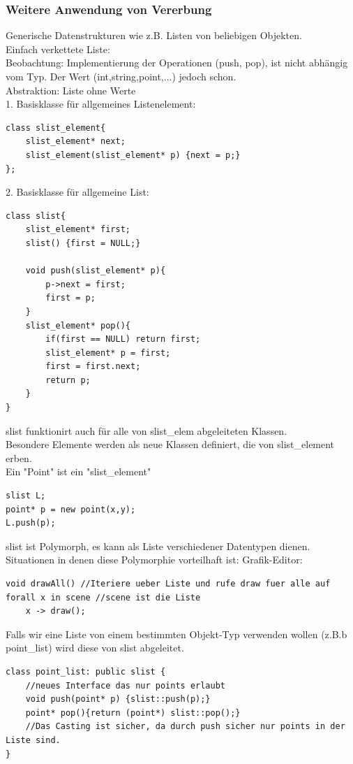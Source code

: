 \documentclass[a4paper]{article}
\begin{document}
\subsubsection*{Weitere Anwendung von Vererbung}
Generische Datenstrukturen wie z.B. Listen von beliebigen Objekten.\\
Einfach verkettete Liste:\\
Beobachtung: Implementierung der Operationen (push, pop), ist nicht abhängig vom Typ. Der Wert (int,string,point,...) jedoch schon.\\
Abstraktion: Liste ohne Werte\\
1. Basisklasse für allgemeines Listenelement:
\begin{lstlisting}
class slist_element{
	slist_element* next;
	slist_element(slist_element* p) {next = p;}
};
\end{lstlisting}
2. Basisklasse für allgemeine List:
\begin{lstlisting}
class slist{
	slist_element* first;
	slist() {first = NULL;}
	
	void push(slist_element* p){
		p->next = first;
		first = p;
	}
	slist_element* pop(){
		if(first == NULL) return first;
		slist_element* p = first;
		first = first.next;
		return p;	
	}
}
\end{lstlisting}
slist funktionirt auch für alle von slist\_elem abgeleiteten Klassen.\\
Besondere Elemente werden als neue Klassen definiert, die von slist\_element erben.\\
Ein "Point" ist ein "slist\_element"\\
\begin{lstlisting}
slist L;
point* p = new point(x,y);
L.push(p);
\end{lstlisting}
slist ist Polymorph, es kann als Liste verschiedener Datentypen dienen.\\
Situationen in denen diese Polymorphie vorteilhaft ist: Grafik-Editor:\\
\begin{lstlisting}
void drawAll() //Iteriere ueber Liste und rufe draw fuer alle auf
forall x in scene //scene ist die Liste
	x -> draw();
\end{lstlisting}
Falls wir eine Liste von einem bestimmten Objekt-Typ verwenden wollen (z.B.b point\_list) wird diese von slist abgeleitet.\\
\begin{lstlisting}
class point_list: public slist {
	//neues Interface das nur points erlaubt
	void push(point* p) {slist::push(p);}
	point* pop(){return (point*) slist::pop();}
	//Das Casting ist sicher, da durch push sicher nur points in der Liste sind.
}
\end{lstlisting}
\end{document}
